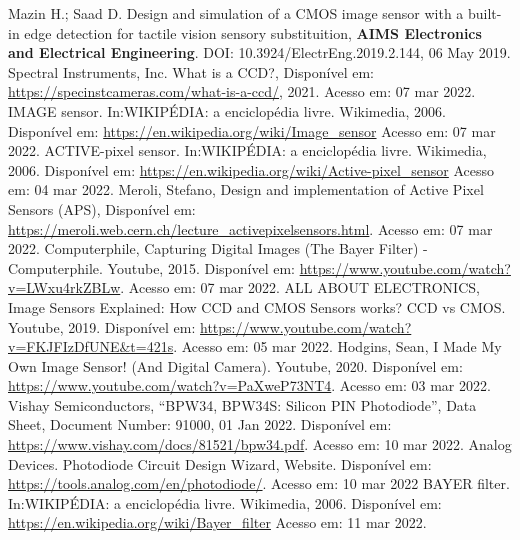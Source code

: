 \documentclass[10pt,a4paper,twocolumn]{article}
\begin{document}
	\begin{thebibliography}{99}
		{Mazin H.; Saad D. {Design and simulation of a CMOS image sensor with a built-in edge detection for tactile vision sensory substituition}, \textbf{AIMS Electronics and Electrical Engineering}. DOI: 10.3924/ElectrEng.2019.2.144, 06 May 2019.}
		{Spectral Instruments, Inc. {What is a CCD?}, Disponível em: \url{https://specinstcameras.com/what-is-a-ccd/}, 2021. Acesso em: 07 mar 2022.}
		{IMAGE sensor. In:WIKIPÉDIA: a enciclopédia livre. Wikimedia, 2006. Disponível em: \url{https://en.wikipedia.org/wiki/Image_sensor} Acesso em: 07 mar 2022.}
		{ACTIVE-pixel sensor. In:WIKIPÉDIA: a enciclopédia livre. Wikimedia, 2006. Disponível em: \url{https://en.wikipedia.org/wiki/Active-pixel_sensor} Acesso em: 04 mar 2022.}
		{Meroli, Stefano, {Design and implementation of Active Pixel Sensors (APS)}, Disponível em: \url{https://meroli.web.cern.ch/lecture_activepixelsensors.html}. Acesso em: 07 mar 2022.}
		{Computerphile, {Capturing Digital Images (The Bayer Filter) - Computerphile}. Youtube, 2015. Disponível em: \url{https://www.youtube.com/watch?v=LWxu4rkZBLw}. Acesso em: 07 mar 2022.}
		{ALL ABOUT ELECTRONICS, {Image Sensors Explained: How CCD and CMOS Sensors works? CCD vs CMOS}. Youtube, 2019. Disponível em: \url{https://www.youtube.com/watch?v=FKJFIzDfUNE&t=421s}. Acesso em: 05 mar 2022.}
		{Hodgins, Sean, {I Made My Own Image Sensor! (And Digital Camera)}. Youtube, 2020. Disponível em: \url{https://www.youtube.com/watch?v=PaXweP73NT4}. Acesso em: 03 mar 2022.}
		{Vishay Semiconductors, {``BPW34, BPW34S: Silicon PIN Photodiode''}, Data Sheet, Document Number: 91000, 01 Jan 2022. Disponível em: \url{https://www.vishay.com/docs/81521/bpw34.pdf}. Acesso em: 10 mar 2022.}
		{Analog Devices. {Photodiode Circuit Design Wizard}, Website. Disponível em: \url{https://tools.analog.com/en/photodiode/}. Acesso em: 10 mar 2022}
		{BAYER filter. In:WIKIPÉDIA: a enciclopédia livre. Wikimedia, 2006. Disponível em: \url{https://en.wikipedia.org/wiki/Bayer_filter} Acesso em: 11 mar 2022.}

	\end{thebibliography}
\end{document}
